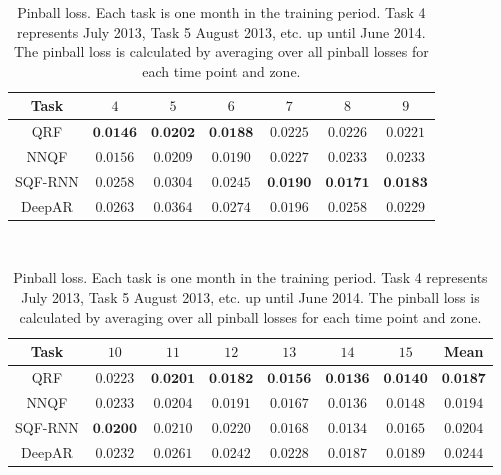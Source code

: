 \begin{table}[ht]%
    \footnotesize
    \hspace*{25pt} %
    \begin{minipage}{\textwidth}
    \renewcommand{\b}[1]{\textbf{#1}}
    \begin{tabular}{c|cccccc}
        \toprule \noalign{\smallskip}
        Task & \(4\) & \(5\) & \(6\) & \(7\) & \(8\) & \(9\) \\
        \midrule
        QRF     & \(\b{0.0146}\) & \(\b{0.0202}\) & \(\b{0.0188}\) & \(0.0225\)     & \(0.0226\)     & \(0.0221\)     \\
        NNQF    & \(0.0156\)     & \(0.0209\)     & \(0.0190\)     & \(0.0227\)     & \(0.0233\)     & \(0.0233\)     \\
        SQF-RNN & \(0.0258\)     & \(0.0304\)     & \(0.0245\)     & \(\b{0.0190}\) & \(\b{0.0171}\) & \(\b{0.0183}\) \\
        DeepAR  & \(0.0263\)     & \(0.0364\)     & \(0.0274\)     & \(0.0196\)     & \(0.0258\)     & \(0.0229\)     \\
        \bottomrule
    \end{tabular}
    \vspace*{1em} \\
    \begin{tabular}{c|cccccc|c}
        \toprule \noalign{\smallskip}
        Task & \(10\) & \(11\) & \(12\) & \(13\) & \(14\) & \(15\) & Mean \\
        \midrule
        QRF     & \(0.0223\)     & \(\b{0.0201}\) & \(\b{0.0182}\) & \(\b{0.0156}\) & \(\b{0.0136}\) & \(\b{0.0140}\) & \(\b{0.0187}\) \\
        NNQF    & \(0.0233\)     & \(0.0204\)     & \(0.0191\)     & \(0.0167\)     & \(0.0136\)     & \(0.0148\)     & \(0.0194\)     \\
        SQF-RNN & \(\b{0.0200}\) & \(0.0210\)     & \(0.0220\)     & \(0.0168\)     & \(0.0134\)     & \(0.0165\)     & \(0.0204\)     \\
        DeepAR  & \(0.0232\)     & \(0.0261\)     & \(0.0242\)     & \(0.0228\)     & \(0.0187\)     & \(0.0189\)     & \(0.0244\)     \\
        \bottomrule
    \end{tabular}
    \end{minipage}

    \caption[Pinball loss]{Pinball loss. 
    Each task is one month in the training period. 
    Task 4 represents July 2013, Task 5 August 2013, etc. up until June 2014.
    The pinball loss is calculated by averaging 
    over all pinball losses for each time point and zone.}
    \label{table:pinball-loss}
\end{table}

